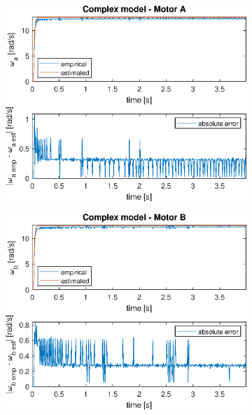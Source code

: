 \documentclass[a4paper,kul]{kulakarticle} %
\begin{document}
\begin{figure}[htp!]
	\centering
	\begin{subfigure}[b]{0.48\textwidth}
		\centering
		\includegraphics[width=\linewidth]{step_response_complex_a.eps}
	\end{subfigure}
	\hfill
	\begin{subfigure}[b]{0.48\textwidth}
		\centering
		\includegraphics[width=\linewidth]{step_response_complex_b.eps}
	\end{subfigure}
	\par\bigskip
	\begin{subfigure}[b]{0.48\textwidth}

\end{subfigure}
\end{figure}
\end{document}
